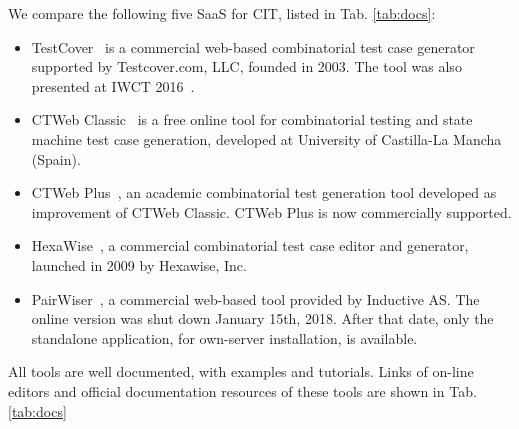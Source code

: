 \begin{tikzborder}{\cite{Gargantini16:validation}}
\begin{tikzborder}{\cite{gargantini_combinatorial_2017}}
\begin{tikzborder}{\cite{gargantini_combinatorial_2017}}
\begin{tikzborder}{\cite{garn2019}}
\begin{tikzborder}{\cite{arcaini2019achieving}}
\begin{tikzborder}{}
We compare the following five SaaS for CIT, listed in Tab. \ref{tab:docs}:
\begin{itemize}
	\item TestCover~\cite{testcover} is a commercial web-based combinatorial test case generator supported by Testcover.com, LLC, founded in 2003. The tool was also presented at IWCT 2016~\cite{sherwood2016embedded}.
	\item CTWeb Classic~\cite{usaolaframework} is a free online tool for combinatorial testing and state machine test case generation,  developed at University of Castilla-La Mancha (Spain).
	\item CTWeb Plus~\cite{ctwebplus}, an academic combinatorial test generation tool developed as improvement of CTWeb Classic. CTWeb Plus is now commercially supported.
	\item HexaWise~\cite{hexawise}, a commercial combinatorial test case editor and generator, launched in 2009 by Hexawise, Inc.
	\item PairWiser~\cite{pairwiser}, a commercial web-based tool provided by Inductive AS. The online version was shut down January 15th, 2018. After that date, only the standalone application, for own-server installation, is available.
\end{itemize}

All tools are well documented, with examples and tutorials. Links of on-line editors and official documentation resources of these tools are shown in Tab. \ref{tab:docs}
\end{tikzborder}

\begin{table}[!hbt]
\end{table}
\end{tikzborder}
\end{tikzborder}
\end{tikzborder}
\end{tikzborder}
\end{tikzborder}
